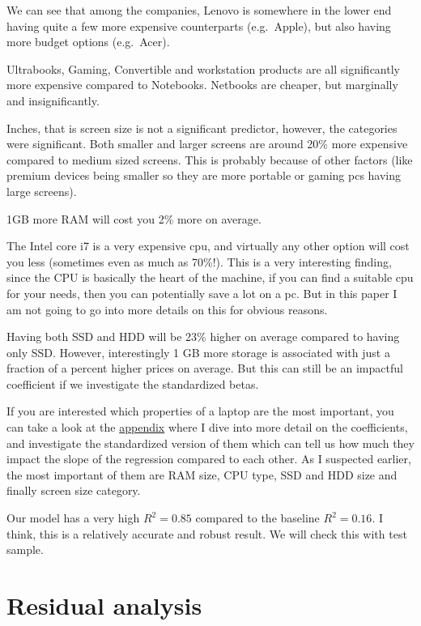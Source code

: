 \documentclass[
]{article}
\begin{document}
We can see that among the companies, Lenovo is somewhere in the lower
end having quite a few more expensive counterparts (e.g.~Apple), but
also having more budget options (e.g.~Acer).

Ultrabooks, Gaming, Convertible and workstation products are all
significantly more expensive compared to Notebooks. Netbooks are
cheaper, but marginally and insignificantly.

Inches, that is screen size is not a significant predictor, however, the
categories were significant. Both smaller and larger screens are around
20\% more expensive compared to medium sized screens. This is probably
because of other factors (like premium devices being smaller so they are
more portable or gaming pcs having large screens).

1GB more RAM will cost you 2\% more on average.

The Intel core i7 is a very expensive cpu, and virtually any other
option will cost you less (sometimes even as much as 70\%!). This is a
very interesting finding, since the CPU is basically the heart of the
machine, if you can find a suitable cpu for your needs, then you can
potentially save a lot on a pc. But in this paper I am not going to go
into more details on this for obvious reasons.

Having both SSD and HDD will be 23\% higher on average compared to
having only SSD. However, interestingly 1 GB more storage is associated
with just a fraction of a percent higher prices on average. But this can
still be an impactful coefficient if we investigate the standardized
betas.

If you are interested which properties of a laptop are the most
important, you can take a look at the
\protect\hyperlink{standardized-residuals}{appendix} where I dive into
more detail on the coefficients, and investigate the standardized
version of them which can tell us how much they impact the slope of the
regression compared to each other. As I suspected earlier, the most
important of them are RAM size, CPU type, SSD and HDD size and finally
screen size category.

Our model has a very high \(R^2=0.85\) compared to the baseline
\(R^2=0.16\). I think, this is a relatively accurate and robust result.
We will check this with test sample.

\hypertarget{residual-analysis}{%
\section{Residual analysis}\label{residual-analysis}}
\end{document}
